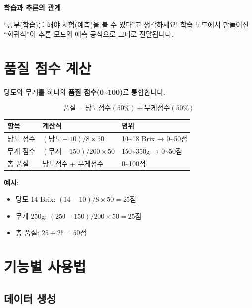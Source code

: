 \documentclass[11pt,a4paper]{article}
\begin{document}
\begin{tipbox}
\textbf{학습과 추론의 관계}

``공부(학습)를 해야 시험(예측)을 볼 수 있다''고 생각하세요! 
학습 모드에서 만들어진 ``회귀식''이 추론 모드의 예측 공식으로 그대로 전달됩니다.
\end{tipbox}

\section{품질 점수 계산}

당도와 무게를 하나의 \textbf{품질 점수(0\textasciitilde100)}로 통합합니다.

\[
\text{품질} = \text{당도점수}(50\%) + \text{무게점수}(50\%)
\]

\begin{center}
\begin{tabular}{lll}
\toprule
\textbf{항목} & \textbf{계산식} & \textbf{범위} \\
\midrule
당도 점수 & $(\text{당도} - 10) / 8 \times 50$ & 10\textasciitilde18 Brix → 0\textasciitilde50점 \\
무게 점수 & $(\text{무게} - 150) / 200 \times 50$ & 150\textasciitilde350g → 0\textasciitilde50점 \\
\midrule
총 품질 & 당도점수 + 무게점수 & 0\textasciitilde100점 \\
\bottomrule
\end{tabular}
\end{center}

\textbf{예시}:
\begin{itemize}
    \item 당도 14 Brix: $(14 - 10) / 8 \times 50 = 25$점
    \item 무게 250g: $(250 - 150) / 200 \times 50 = 25$점
    \item 총 품질: $25 + 25 = 50$점
\end{itemize}

\section{기능별 사용법}

\subsection{데이터 생성}
\end{document}
